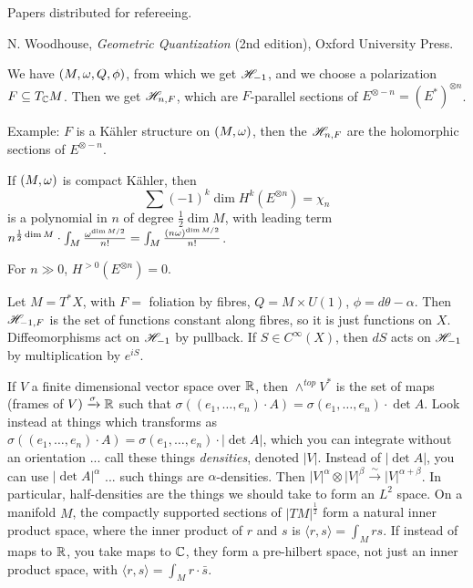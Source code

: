  \setcounter{lecture}{24}

 Papers distributed for refereeing.

 N. Woodhouse, \emph{Geometric Quantization} (2nd edition), Oxford University Press.

 We have $(M,\omega,Q,\phi)$, from which we get $\mathscr{H}_{-1}$, and we choose a polarization
 $F\subseteq T_{\mathbb{C}} M$.  Then we get $\mathscr{H}_{n,F}$, which are $F$-parallel sections of
 $E^{\otimes-n} = (E^*)^{\otimes n}$.

 Example: $F$ is a K\"ahler structure on $(M,\omega)$, then the $\mathscr{H}_{n,F}$ are the
 holomorphic sections of $E^{\otimes -n}$.

 \begin{theorem}
   If $(M,\omega)$ is compact K\"ahler, then
   \[\sum (-1)^k \dim H^k(E^{\otimes n}) = \chi_n\]
   is a polynomial in $n$ of degree $\frac{1}{2}\dim M$, with leading term $n^{\frac{1}{2}\dim
   M}\cdot \int_M \frac{\omega^{\dim M /2}}{n!} = \int_M \frac{(n\omega)^{\dim M/2}}{n!}$.
 \end{theorem}

 \begin{theorem}
   For $n\gg 0$, $H^{>0}(E^{\otimes n})=0$.
 \end{theorem}

 Let $M=T^*X$, with $F=$ foliation by fibres, $Q= M\times U(1)$, $\phi =
 d\theta-\alpha$.  Then $\mathscr{H}_{-1,F}$ is the set of functions constant along fibres, so it
 is just functions on $X$.  Diffeomorphisms act on $\mathscr{H}_{-1}$ by pullback.  If $S\in
 C^\infty(X)$, then $dS$ acts on $\mathscr{H}_{-1}$ by multiplication by $e^{iS}$.

 If $V$ a finite dimensional vector space over $\mathbb{R}$, then $\wedge^{top} V^*$ is the
 set of maps (frames of $V)\xrightarrow{\sigma} \mathbb{R}$ such that $\sigma((e_1,\dots,
 e_n)\cdot A) = \sigma(e_1,\dots, e_n)\cdot \det A$.  Look instead at things which
 transforms as $\sigma((e_1,\dots, e_n)\cdot A) = \sigma(e_1,\dots, e_n)\cdot |\det
 A|$, which you can integrate without an orientation ... call these things
 \emph{densities}, denoted $|V|$.  Instead of $|\det A|$, you can use $|\det A
 |^\alpha$ ... such things are $\alpha$-densities.  Then $|V|^\alpha\otimes
 |V|^\beta\xrightarrow{\sim} |V|^{\alpha+\beta}$.  In particular, half-densities are
 the things we should take to form an $L^2$ space.  On a manifold $M$, the compactly
 supported sections of $|TM|^{\frac{1}{2}}$ form a natural inner product space, where
 the inner product of $r$ and $s$ is $\langle r,s\rangle = \int_M rs$.  If instead of
 maps to $\mathbb{R}$, you take maps to $\mathbb{C}$, they form a pre-hilbert space, not just an
 inner product space, with $\langle r, s\rangle = \int_M r\cdot \bar s$.

